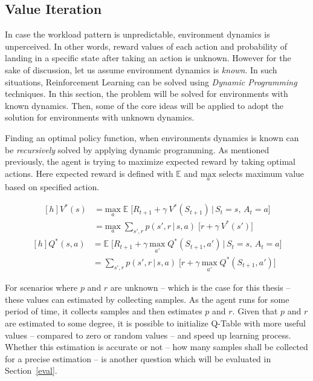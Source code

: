 \subsection{Value Iteration}
\label{des:val}
In case the workload pattern is unpredictable, environment dynamics is unperceived. In other words, reward values of each action and probability of landing in a specific state after taking an action is unknown. However for the sake of discussion, let us assume environment dynamics is \emph{known}. In such situations, Reinforcement Learning can be solved using \emph{Dynamic Programming} techniques. In this section, the problem will be solved for environments with known dynamics. Then, some of the core ideas will be applied to adopt the solution for environments with unknown dynamics.

Finding an optimal policy function, when environments dynamics is known can be \emph{recursively} solved by applying dynamic programming. As mentioned previously, the agent is trying to maximize expected reward by taking optimal actions. Here expected reward is defined with $\mathbb E$ and $\underset{a}{\text{max}}$ selects maximum value based on specified action.

\begin{equation}
\begin{aligned}[h]
V^*(s) &= \underset{a}{\text{max}} \; \mathbb E\;\big[R_{t+1} + \gamma\:V^*(S_{t+1})\,|\,S_t=s,\,A_t=a\big] \\
&= \underset{a}{\text{max}} \; \sum_{s',r} p(s',r\,|\,s,a)\;\Big[r + \gamma\:V^*(s')\Big]
\end{aligned}
\label{des:eq:dpv}
\end{equation}
\begin{equation}
\begin{aligned}[h]
Q^*(s,a) &= \mathbb E\;\big[R_{t+1} + \gamma\:\underset{a'}{\text{max}}\;Q^*(S_{t+1},a')\,|\,S_t=s,\,A_t=a\big] \\
&= \sum_{s',r} p(s',r\,|\,s,a)\;\Big[r + \gamma\:\underset{a'}{\text{max}}\;Q^*(S_{t+1},a')\Big]
\end{aligned}
\label{des:eq:dpq}
\end{equation}

For scenarios where $p$ and $r$ are unknown -- which is the case for this thesis -- these values can estimated by collecting samples. As the agent runs for some period of time, it collects samples and then estimates $p$ and $r$. Given that $p$ and $r$ are estimated to some degree, it is possible to initialize Q-Table with more useful values -- compared to zero or random values -- and speed up learning process. Whether this estimation is accurate or not -- how many samples shall be collected for a precise estimation -- is another question which will be evaluated in Section~\ref{eval}.

